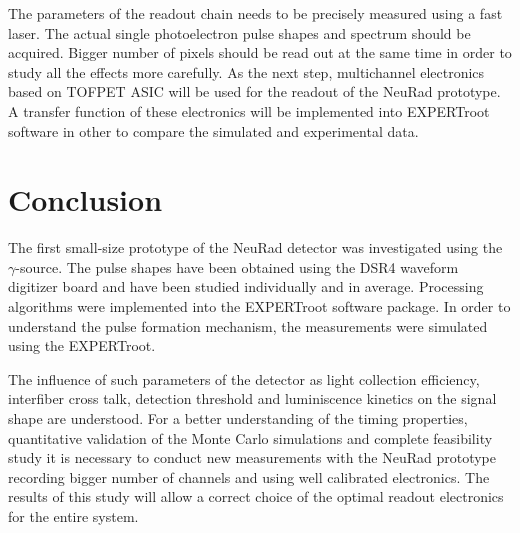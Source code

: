 \documentclass{webofc}
\newcommand{\er}{\textmd{EXPERTroot}}
\begin{document}
The parameters of the readout chain needs to be precisely measured using a fast laser. The actual single photoelectron pulse shapes and spectrum should be acquired. Bigger number of pixels should be read out at the same time in order to study all the effects more carefully. As the next step, multichannel electronics based on TOFPET ASIC \cite{petsys} will be used for the readout of the NeuRad prototype. A transfer function of these electronics will be implemented into \er\, software in other to compare the simulated and experimental data.


\section{Conclusion}
		
	The first small-size prototype of the NeuRad detector was investigated using the $\gamma$-source. The pulse shapes have been obtained using the DSR4 waveform digitizer board and have been studied individually and in average. Processing algorithms were implemented into the EXPERTroot software package.
	In order to understand the pulse formation mechanism, the measurements were simulated using the \er.
	
	The influence of such parameters of the detector as light collection efficiency, interfiber cross talk, detection threshold and luminiscence kinetics on the signal shape are understood. For a better understanding of the timing properties, quantitative validation of the Monte Carlo simulations and complete feasibility study it is necessary to conduct new measurements with the NeuRad prototype recording bigger number of channels and using well calibrated electronics.
	The results of this study will allow a correct choice of the optimal readout electronics for the entire system.
	
	
	
	
	
\end{document}

